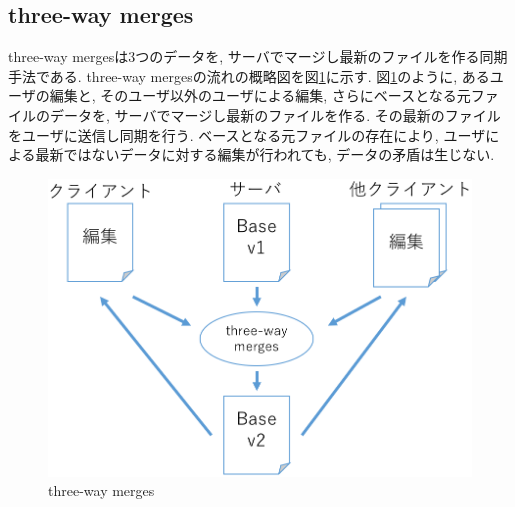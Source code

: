 \subsection{three-way merges}
three-way mergesは3つのデータを, サーバでマージし最新のファイルを作る同期手法である. three-way mergesの流れの概略図を図\ref{threeway}に示す. 図\ref{threeway}のように, あるユーザの編集と, そのユーザ以外のユーザによる編集, さらにベースとなる元ファイルのデータを, サーバでマージし最新のファイルを作る. その最新のファイルをユーザに送信し同期を行う. ベースとなる元ファイルの存在により, ユーザによる最新ではないデータに対する編集が行われても, データの矛盾は生じない.
\begin{figure}[htbp]
  \begin{center}
    \includegraphics[scale=0.3]{images/threeway}
    \caption{three-way merges}
    \label{threeway}
  \end{center}
\end{figure}
%
